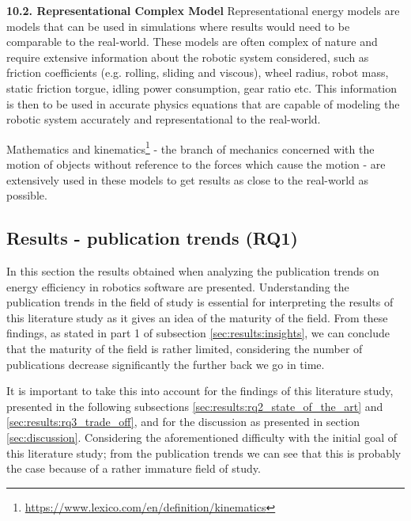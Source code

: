 \vspace{2mm} \noindent \textbf{10.2. Representational Complex Model}
Representational energy models are models that can be used in simulations where results would need to be comparable to the real-world.
These models are often complex of nature and require extensive information about the robotic system considered, such as
friction coefficients (e.g. rolling, sliding and viscous), wheel radius, robot mass, static friction torgue, 
idling power consumption, gear ratio etc.
This information is then to be used in accurate physics equations that are capable of modeling the robotic system accurately and
representational to the real-world.

Mathematics and kinematics\footnote{\url{https://www.lexico.com/en/definition/kinematics}} 
- the branch of mechanics concerned with the motion of objects without reference to the forces which cause the motion -
are extensively used in these models to get results as close to the real-world as possible.


\subsection{Results - publication trends (RQ1)}
\label{sec:results:rq1_pub_trends}

In this section the results obtained when analyzing the publication trends on energy efficiency in robotics software are presented.
Understanding the publication trends in the field of study is essential for interpreting the results of this literature study as it gives
an idea of the maturity of the field. 
From these findings, as stated in part 1 of subsection \ref{sec:results:insights}, we can conclude that the maturity of the field is rather limited,
considering the number of publications decrease significantly the further back we go in time.

It is important to take this into account for the findings of this literature study, presented in the following subsections 
\ref{sec:results:rq2_state_of_the_art} and \ref{sec:results:rq3_trade_off}, and for the discussion as presented in section \ref{sec:discussion}.
Considering the aforementioned difficulty with the initial goal of this literature study; from the publication trends we can see that this 
is probably the case because of a rather immature field of study.

